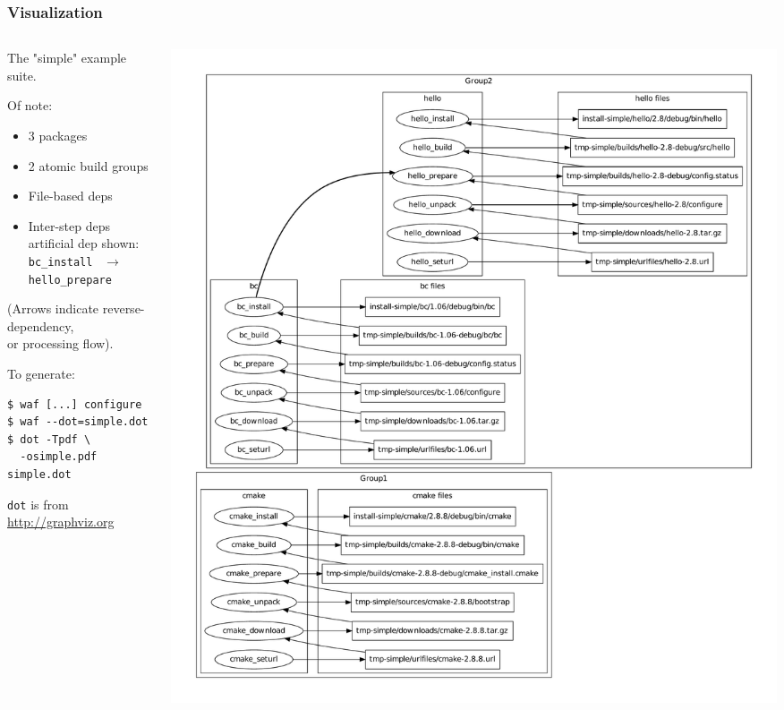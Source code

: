 \documentclass[xcolor=dvipsnames]{beamer}
\begin{document}
\begin{frame}[fragile]
  \frametitle{Visualization}
  \begin{columns}
    \begin{column}{0.3\paperwidth}
      {\footnotesize
      The "simple" example suite.

        Of note:
      \begin{itemize}
      \item 3 packages
      \item 2 atomic build groups
      \item File-based deps
      \item Inter-step deps\\
        {\tiny artificial dep shown:\\
          \verb|bc_install| \
          $\rightarrow$ \verb|hello_prepare|}
      \end{itemize}
      {\tiny (Arrows indicate reverse-dependency, \\
        or processing flow).}

      To generate:

\begin{verbatim}
$ waf [...] configure
$ waf --dot=simple.dot
$ dot -Tpdf \
  -osimple.pdf simple.dot
\end{verbatim}
}
{\tiny \texttt{dot} is from \url{http://graphviz.org}}


    \end{column}
    \begin{column}{0.6\paperwidth}
      \vspace{-1cm}
      \includegraphics[height=\textheight]{simple}
    \end{column}
  \end{columns}

\end{frame}
\end{document}
